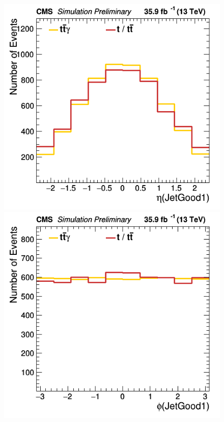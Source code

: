 \documentclass[11pt]{scrartcl}
\begin{document}
	\begin{figure}[H]
	\centering
	\begin{minipage}{.5\textwidth}
	  \centering
	  \includegraphics[width=0.75\linewidth]{figures/Notused/JetGood1_eta.png}
	\end{minipage}%
	\begin{minipage}{.5\textwidth}
	  \centering
	  \includegraphics[width=0.75\linewidth]{figures/Notused/JetGood1_phi.png}
	\end{minipage}
	\end{figure}
	
\end{document}
